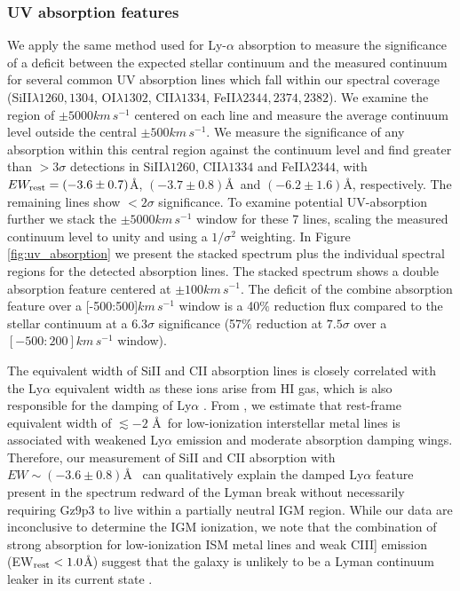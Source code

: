 \documentclass[sn-mathphys]{sn-jnl}%
\theoremstyle{thmstyleone}%
\theoremstyle{thmstyletwo}%
\theoremstyle{thmstylethree}%
\begin{document}
\subsubsection{UV absorption features}\label{sec:absorption_lines} 
We apply the same method used for Ly-$\alpha$ absorption to measure the significance of a deficit between the expected stellar continuum and the measured continuum for several common UV absorption lines which fall within our spectral coverage (SiII$\lambda1260,1304$, OI$\lambda1302$, CII$\lambda1334$, FeII$\lambda2344,2374,2382$).
We examine the region of $\pm5000km\,s^{-1}$ centered on each line and measure the average continuum level outside the central $\pm500km\,s^{-1}$. We measure the significance of any absorption within this central region against the continuum level and find greater than $>3\sigma$ detections in SiII$\lambda1260$, CII$\lambda1334$ and FeII$\lambda2344$, with $EW_{\rm rest} = (-3.6\pm0.7)$\AA, $(-3.7\pm0.8)$\AA\ and $(-6.2\pm1.6)$\AA, respectively. The remaining lines show $<2\sigma$ significance. 
To examine potential UV-absorption further we stack the $\pm5000 km\,s^{-1}$ window for these 7 lines, scaling the measured continuum level to unity and using a $1/\sigma^2$ weighting. In Figure \ref{fig:uv_absorption} we present the stacked spectrum plus the individual spectral regions for the detected absorption lines. 
The stacked spectrum shows a double absorption feature centered at $\pm100 km\,s^{-1}$. The deficit of the combine absorption feature over a [-500:500]$km\,s^{-1}$ window is a 40$\%$ reduction flux compared to the stellar continuum at a $6.3\sigma$ significance (57$\%$ reduction at $7.5\sigma$ over a $[-500:200]km\,s^{-1}$ window). 

The equivalent width of SiII and CII absorption lines is closely correlated with the Ly$\alpha$ equivalent width as these ions arise from HI gas, which is also responsible for the damping of Ly$\alpha$ \cite{Jones2012, Leethochawalit2016, Pahl2020, Du2018, Shapley03}. From \cite{Pahl2020}, we estimate that rest-frame equivalent width of $\lesssim -2$ \AA\ for low-ionization interstellar metal lines is associated with weakened Ly$\alpha$ emission and moderate absorption damping wings. Therefore, our measurement of SiII and CII absorption with $EW\sim (-3.6 \pm 0.8)$\AA~ can qualitatively explain the damped Ly$\alpha$ feature present in the spectrum redward of the Lyman break without necessarily requiring Gz9p3 to live within a partially neutral IGM region. While our data are inconclusive to determine the IGM ionization, we note that the combination of strong absorption for low-ionization ISM metal lines and weak CIII] emission (EW$_{\rm rest} < 1.0$\AA) suggest that the galaxy is unlikely to be a Lyman continuum leaker in its current state \cite{Shapley03,Lopez2022}.
\end{document}
